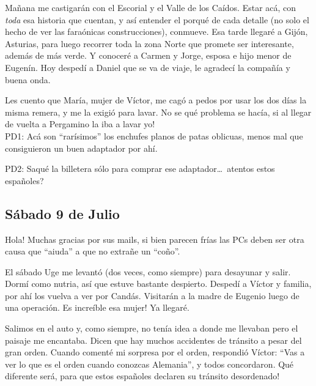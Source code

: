 Ma\~nana me castigar\'an con el Escorial y el Valle de los Ca\'idos. Estar
ac\'a, con \emph{toda} esa historia que cuentan, y as\'i entender el porqu\'e
de cada detalle (no solo el hecho de ver las fara\'onicas construcciones),
conmueve. Esa tarde llegar\'e a Gij\'on, Asturias, para luego recorrer toda la
zona Norte que promete ser interesante, adem\'as de m\'as verde. Y conocer\'e
a Carmen y Jorge, esposa e hijo menor de Eugen\'in. Hoy desped\'i a Daniel que
se va de viaje, le agradec\'i la compa\~n\'ia y buena onda.

Les cuento que Mar\'ia, mujer de V\'ictor, me cag\'o a pedos por usar los dos
d\'ias la misma remera, y me la exigi\'o para lavar. \textexclamdown No se
qu\'e problema se hac\'ia, si al llegar de vuelta a Pergamino la iba a lavar
yo!\\

PD1: Ac\'a son ``rar\'isimos'' los enchufes planos de patas oblicuas, menos
mal que consiguieron un buen adaptador por ah\'i.

PD2: Saqu\'e la billetera s\'olo para comprar ese adaptador\ldots\
\textquestiondown atentos estos espa\~noles?

\subsection*{S\'abado 9 de Julio}

\textexclamdown Hola! Muchas gracias por sus mails, si bien parecen fr\'ias
las {\small PC}s deben ser otra causa que ``aiuda'' a que no extra\~ne un
``co\~no''.

El s\'abado Uge me levant\'o (dos veces, como siempre) para desayunar y salir.
Dorm\'i como nutria, as\'i que estuve bastante despierto. Desped\'i a V\'ictor
y familia, por ah\'i los vuelva a ver por Cand\'as. Visitar\'an a la madre de
Eugenio luego de una operaci\'on. \textexclamdown Es incre\'ible esa mujer! Ya
llegar\'e.

Salimos en el auto y, como siempre, no ten\'ia idea a donde me llevaban pero
el paisaje me encantaba. Dicen que hay muchos accidentes de tr\'ansito a pesar
del gran orden. Cuando coment\'e mi sorpresa por el orden, respondi\'o
V\'ictor: ``Vas a ver lo que es el orden cuando conozcas Alemania'', y todos
concordaron. \textexclamdown Qu\'e diferente ser\'a, para que estos
espa\~noles declaren su tr\'ansito desordenado!

